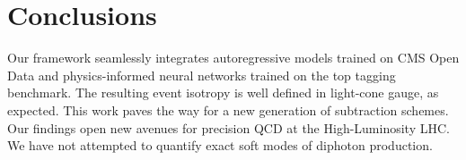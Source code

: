 \section{Conclusions}\label{sec:conclusions}

Our framework seamlessly integrates autoregressive models trained on CMS
Open Data and physics-informed neural networks trained on the top
tagging benchmark. The resulting event isotropy is well defined in
light-cone gauge, as expected. This work paves the way for a new
generation of subtraction schemes. Our findings open new avenues for
precision QCD at the High-Luminosity LHC. We have not attempted to
quantify exact soft modes of diphoton production.

